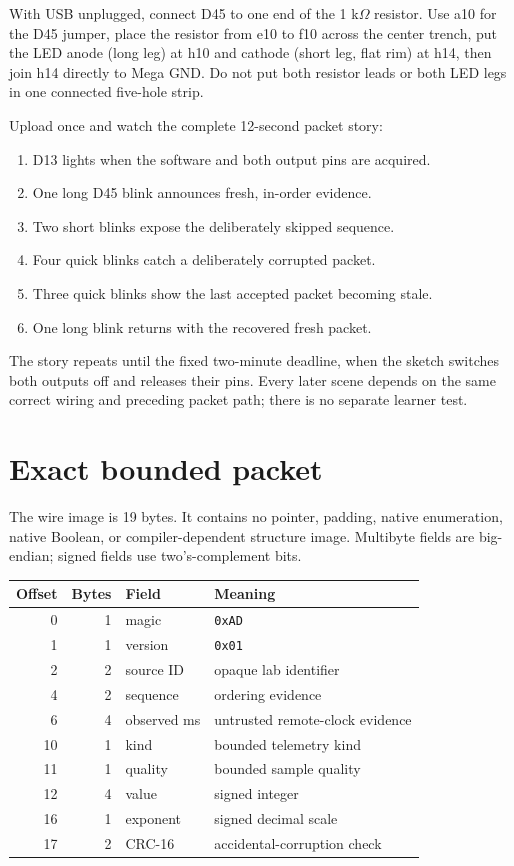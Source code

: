\documentclass[11pt]{article}
\begin{document}
With USB unplugged, connect D45 to one end of the 1 k\(\Omega\) resistor.
Use a10 for the D45 jumper, place the resistor from e10 to f10 across the center
trench, put the LED anode (long leg) at h10 and cathode (short leg, flat rim) at
h14, then join h14 directly to Mega GND. Do not put both resistor leads or both
LED legs in one connected five-hole strip.

Upload once and watch the complete 12-second packet story:
\begin{enumerate}
  \item D13 lights when the software and both output pins are acquired.
  \item One long D45 blink announces fresh, in-order evidence.
  \item Two short blinks expose the deliberately skipped sequence.
  \item Four quick blinks catch a deliberately corrupted packet.
  \item Three quick blinks show the last accepted packet becoming stale.
  \item One long blink returns with the recovered fresh packet.
\end{enumerate}
The story repeats until the fixed two-minute deadline, when the sketch switches
both outputs off and releases their pins. Every later scene depends on the same
correct wiring and preceding packet path; there is no separate learner test.

\section{Exact bounded packet}

The wire image is 19 bytes. It contains no pointer, padding, native enumeration,
native Boolean, or compiler-dependent structure image. Multibyte fields are
big-endian; signed fields use two's-complement bits.

\begin{tabularx}{\linewidth}{@{}r r l X@{}}
\toprule
Offset & Bytes & Field & Meaning\\
\midrule
0 & 1 & magic & \texttt{0xAD}\\
1 & 1 & version & \texttt{0x01}\\
2 & 2 & source ID & opaque lab identifier\\
4 & 2 & sequence & ordering evidence\\
6 & 4 & observed ms & untrusted remote-clock evidence\\
10 & 1 & kind & bounded telemetry kind\\
11 & 1 & quality & bounded sample quality\\
12 & 4 & value & signed integer\\
16 & 1 & exponent & signed decimal scale\\
17 & 2 & CRC-16 & accidental-corruption check\\
\bottomrule
\end{tabularx}
\end{document}
